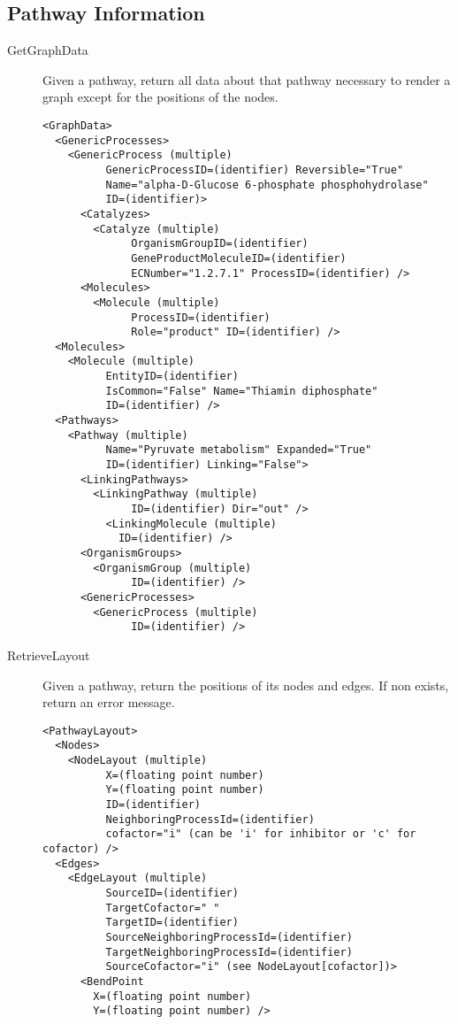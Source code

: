 \subsection{Pathway Information}
\begin{description}

    \item[GetGraphData] Given a pathway, return all data about that pathway
    necessary to render a graph except for the positions of the nodes.

    \begin{lstlisting}
<GraphData>
  <GenericProcesses>
    <GenericProcess (multiple)
          GenericProcessID=(identifier) Reversible="True"
          Name="alpha-D-Glucose 6-phosphate phosphohydrolase"
          ID=(identifier)>
      <Catalyzes>
        <Catalyze (multiple)
              OrganismGroupID=(identifier)
              GeneProductMoleculeID=(identifier)
              ECNumber="1.2.7.1" ProcessID=(identifier) />
      <Molecules>
        <Molecule (multiple)
              ProcessID=(identifier)
              Role="product" ID=(identifier) />
  <Molecules>
    <Molecule (multiple)
          EntityID=(identifier)
          IsCommon="False" Name="Thiamin diphosphate"
          ID=(identifier) />
  <Pathways>
    <Pathway (multiple)
          Name="Pyruvate metabolism" Expanded="True"
          ID=(identifier) Linking="False">
      <LinkingPathways>
        <LinkingPathway (multiple)
              ID=(identifier) Dir="out" />
          <LinkingMolecule (multiple)
            ID=(identifier) />
      <OrganismGroups>
        <OrganismGroup (multiple)
              ID=(identifier) />
      <GenericProcesses>
        <GenericProcess (multiple)
              ID=(identifier) />
    \end{lstlisting}

    \item[RetrieveLayout] Given a pathway, return the positions of its nodes
    and edges. If non exists, return an error message.

    \begin{lstlisting}
<PathwayLayout>
  <Nodes>
    <NodeLayout (multiple)
          X=(floating point number)
          Y=(floating point number)
          ID=(identifier)
          NeighboringProcessId=(identifier)
          cofactor="i" (can be 'i' for inhibitor or 'c' for cofactor) />
  <Edges>
    <EdgeLayout (multiple)
          SourceID=(identifier)
          TargetCofactor=" "
          TargetID=(identifier)
          SourceNeighboringProcessId=(identifier)
          TargetNeighboringProcessId=(identifier)
          SourceCofactor="i" (see NodeLayout[cofactor])>
      <BendPoint
        X=(floating point number)
        Y=(floating point number) />
    

\end{lstlisting}
\end{description}

